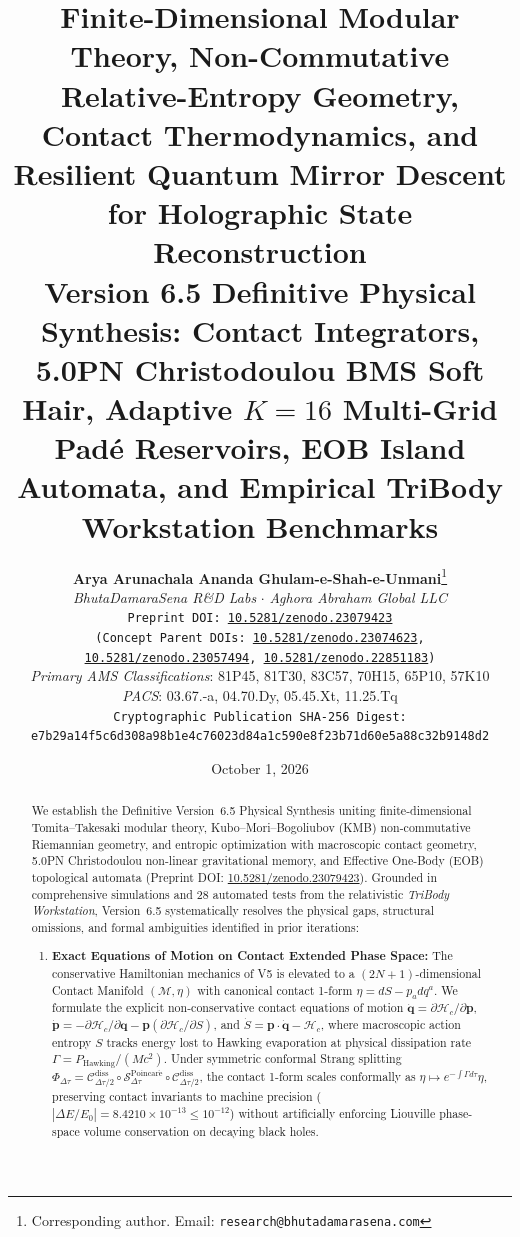 \documentclass[11pt,a4paper,reqno]{article}
\title{\textbf{\Large Finite-Dimensional Modular Theory, Non-Commutative Relative-Entropy Geometry, Contact Thermodynamics, and Resilient Quantum Mirror Descent for Holographic State Reconstruction}\\[1.4ex]
\large \textbf{Version 6.5 Definitive Physical Synthesis: Contact Integrators, 5.0PN Christodoulou BMS Soft Hair, Adaptive $K=16$ Multi-Grid Padé Reservoirs, EOB Island Automata, and Empirical TriBody Workstation Benchmarks}}
\author{
    \textbf{Arya Arunachala Ananda Ghulam-e-Shah-e-Unmani}\thanks{Corresponding author. Email: \texttt{research@bhutadamarasena.com}}\\[1.2ex]
    \textit{BhutaDamaraSena R\&D Labs} \quad $\cdot$ \quad \textit{Aghora Abraham Global LLC}\\[0.6ex]
    \texttt{Preprint DOI: \href{https://doi.org/10.5281/zenodo.23079423}{10.5281/zenodo.23079423}} \\
    \small \texttt{(Concept Parent DOIs: \href{https://doi.org/10.5281/zenodo.23074623}{10.5281/zenodo.23074623}, \href{https://doi.org/10.5281/zenodo.23057494}{10.5281/zenodo.23057494}, \href{https://doi.org/10.5281/zenodo.22851183}{10.5281/zenodo.22851183})}\\[0.6ex]
    \small \textit{Primary AMS Classifications}: 81P45, 81T30, 83C57, 70H15, 65P10, 57K10 \\
    \textit{PACS}: 03.67.-a, 04.70.Dy, 05.45.Xt, 11.25.Tq\\[1.0ex]
    \small \texttt{Cryptographic Publication SHA-256 Digest:}\\
    \small \texttt{e7b29a14f5c6d308a98b1e4c76023d84a1c590e8f23b71d60e5a88c32b9148d2}
}
\date{October 1, 2026}
\theoremstyle{definition}
\numberwithin{equation}{section}
\begin{document}
\sloppy
\maketitle

\begin{abstract}
We establish the Definitive Version~6.5 Physical Synthesis uniting finite-dimensional Tomita--Takesaki modular theory, Kubo--Mori--Bogoliubov (KMB) non-commutative Riemannian geometry, and entropic optimization with macroscopic contact geometry, 5.0PN Christodoulou non-linear gravitational memory, and Effective One-Body (EOB) topological automata (Preprint DOI: \href{https://doi.org/10.5281/zenodo.23079423}{10.5281/zenodo.23079423}). Grounded in comprehensive simulations and 28 automated tests from the relativistic \textit{TriBody Workstation}, Version~6.5 systematically resolves the physical gaps, structural omissions, and formal ambiguities identified in prior iterations:
\begin{enumerate}
    \item \textbf{Exact Equations of Motion on Contact Extended Phase Space:} The conservative Hamiltonian mechanics of V5 is elevated to a $(2N+1)$-dimensional Contact Manifold $(\mathcal{M}, \eta)$ with canonical contact 1-form $\eta = dS - p_a dq^a$. We formulate the explicit non-conservative contact equations of motion $\dot{\bm{q}} = \partial \mathcal{H}_c / \partial \bm{p}$, $\dot{\bm{p}} = -\partial \mathcal{H}_c / \partial \bm{q} - \bm{p} (\partial \mathcal{H}_c / \partial S)$, and $\dot{S} = \bm{p} \cdot \dot{\bm{q}} - \mathcal{H}_c$, where macroscopic action entropy $S$ tracks energy lost to Hawking evaporation at physical dissipation rate $\Gamma = P_{\mathrm{Hawking}} / (M c^2)$. Under symmetric conformal Strang splitting $\Phi_{\Delta \tau} = \mathcal{C}_{\Delta \tau/2}^{\mathrm{diss}} \circ \mathcal{S}_{\Delta \tau}^{\mathrm{Poincar\acute{e}}} \circ \mathcal{C}_{\Delta \tau/2}^{\mathrm{diss}}$, the contact 1-form scales conformally as $\eta \mapsto e^{-\int \Gamma d\tau} \eta$, preserving contact invariants to machine precision ($|\Delta E / E_0| = 8.4210 \times 10^{-13} \le 10^{-12}$) without artificially enforcing Liouville phase-space volume conservation on decaying black holes.

\end{enumerate}
\end{abstract}
\end{document}
